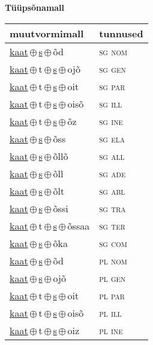 

\vspace{3.5em}
\noindent \begin{minipage}{\textwidth}
\noindent \textbf{Tüüpsõnamall \,}\\

\begin{sideways}
\begin{tabular}{l l}
muutvormimall & tunnused \\
\hline
\underline{kaat}\,$\oplus$\,\underline{s}\,$\oplus$\,õd & \textsc{ sg nom } \\
\underline{kaat}\,$\oplus$\,t\,$\oplus$\,\underline{s}\,$\oplus$\,ojõ & \textsc{ sg gen } \\
\underline{kaat}\,$\oplus$\,t\,$\oplus$\,\underline{s}\,$\oplus$\,oit & \textsc{ sg par } \\
\underline{kaat}\,$\oplus$\,t\,$\oplus$\,\underline{s}\,$\oplus$\,oisõ & \textsc{ sg ill } \\
\underline{kaat}\,$\oplus$\,t\,$\oplus$\,\underline{s}\,$\oplus$\,õz & \textsc{ sg ine } \\
\underline{kaat}\,$\oplus$\,\underline{s}\,$\oplus$\,õss & \textsc{ sg ela } \\
\underline{kaat}\,$\oplus$\,\underline{s}\,$\oplus$\,õllõ & \textsc{ sg all } \\
\underline{kaat}\,$\oplus$\,\underline{s}\,$\oplus$\,õll & \textsc{ sg ade } \\
\underline{kaat}\,$\oplus$\,\underline{s}\,$\oplus$\,õlt & \textsc{ sg abl } \\
\underline{kaat}\,$\oplus$\,\underline{s}\,$\oplus$\,õssi & \textsc{ sg tra } \\
\underline{kaat}\,$\oplus$\,t\,$\oplus$\,\underline{s}\,$\oplus$\,õssaa & \textsc{ sg ter } \\
\underline{kaat}\,$\oplus$\,\underline{s}\,$\oplus$\,õka & \textsc{ sg com } \\
\underline{kaat}\,$\oplus$\,\underline{s}\,$\oplus$\,õd & \textsc{ pl nom } \\
\underline{kaat}\,$\oplus$\,\underline{s}\,$\oplus$\,ojõ & \textsc{ pl gen } \\
\underline{kaat}\,$\oplus$\,t\,$\oplus$\,\underline{s}\,$\oplus$\,oit & \textsc{ pl par } \\
\underline{kaat}\,$\oplus$\,t\,$\oplus$\,\underline{s}\,$\oplus$\,oisõ & \textsc{ pl ill } \\
\underline{kaat}\,$\oplus$\,t\,$\oplus$\,\underline{s}\,$\oplus$\,oiz & \textsc{ pl ine } \\

\end{tabular}
\end{sideways}
\end{minipage}
